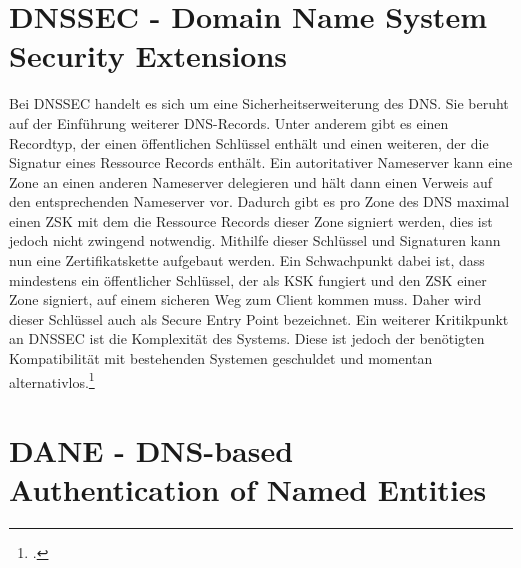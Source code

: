 \section{DNSSEC - Domain Name System Security Extensions}
\label{sec:dnssec}
	Bei \ac{DNSSEC} handelt es sich um eine Sicherheitserweiterung des \ac{DNS}.
	Sie beruht auf der Einführung weiterer \ac{DNS}-Records.
	Unter anderem gibt es einen Recordtyp, der einen öffentlichen Schlüssel enthält und einen weiteren, der die Signatur eines Ressource Records enthält.
	Ein autoritativer Nameserver kann eine Zone an einen anderen Nameserver delegieren und hält dann einen Verweis auf den entsprechenden Nameserver vor.
	Dadurch gibt es pro Zone des \ac{DNS} maximal einen \ac{ZSK} mit dem die Ressource Records dieser Zone signiert werden, dies ist jedoch nicht zwingend notwendig.
	Mithilfe dieser Schlüssel und Signaturen kann nun eine Zertifikatskette aufgebaut werden.
	Ein Schwachpunkt dabei ist, dass mindestens ein öffentlicher Schlüssel, der als \ac{KSK} fungiert und den \ac{ZSK} einer Zone signiert, auf einem sicheren Weg zum Client kommen muss.
	Daher wird dieser Schlüssel auch als Secure Entry Point bezeichnet.
	Ein weiterer Kritikpunkt an \ac{DNSSEC} ist die Komplexität des Systems.
	Diese ist jedoch der benötigten Kompatibilität mit bestehenden Systemen geschuldet und momentan alternativlos.\footcite[Vgl.][S. 195]{Sorge2013}

\section{DANE - DNS-based Authentication of Named Entities}
\label{sec:dane}